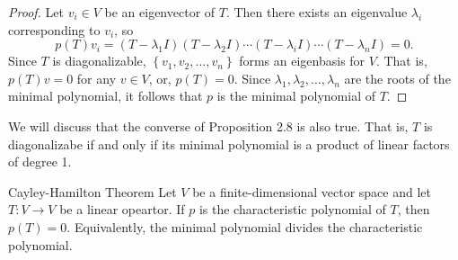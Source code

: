 \documentclass[math_245.tex]{subfiles}
\begin{document}
    \begin{proof}
        Let $v_i\in V$ be an eigenvector of $T$. Then there exists an eigenvalue $\lambda_i$ corresponding to $v_i$, so
        \begin{equation*}
            p(T)v_i = \left( T-\lambda_1 I \right) \left( T-\lambda_2 I \right) \cdots \left( T-\lambda_i I \right) \cdots \left( T-\lambda_n I \right) = 0.
        \end{equation*}
        Since $T$ is diagonalizable, $\left\lbrace v_1, v_2, \ldots, v_n \right\rbrace$ forms an eigenbasis for $V$. That is, $p(T)v = 0$ for any $v\in V$, or, $p(T) = 0$. Since $\lambda_1, \lambda_2, \ldots, \lambda_n$ are the roots of the minimal polynomial, it follows that $p$ is the minimal polynomial of $T$.
    \end{proof}

    \begin{remark}
        We will discuss that the converse of Proposition 2.8 is also true. That is, $T$ is diagonalizabe if and only if its minimal polynomial is a product of linear factors of degree 1.
    \end{remark}

    \begin{theorem}{Cayley-Hamilton Theorem}
        Let $V$ be a finite-dimensional vector space and let $T: V\to V$ be a linear opeartor. If $p$ is the characteristic polynomial of $T$, then $p(T) = 0$. Equivalently, the minimal polynomial divides the characteristic polynomial. 
    \end{theorem}
\end{document}
